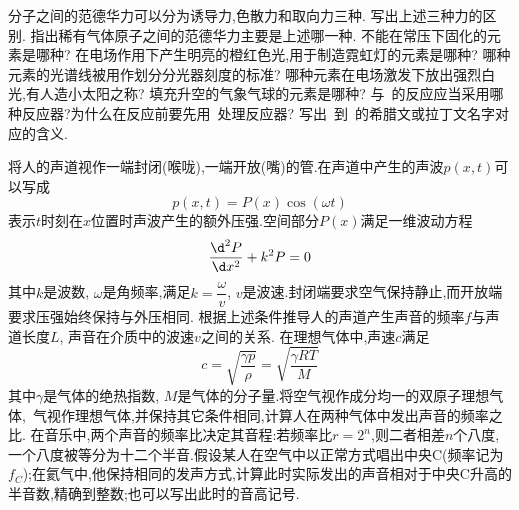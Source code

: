 \documentclass{ctexbook}
\begin{document}
\begin{problem}{}
    \subproblem 分子之间的范德华力可以分为诱导力,色散力和取向力三种.
    \subsubproblem 写出上述三种力的区别.
    \subsubproblem 指出稀有气体原子之间的范德华力主要是上述哪一种.
    \subproblem 不能在常压下固化的元素是哪种?
    \subproblem 在电场作用下产生明亮的橙红色光,用于制造霓虹灯的元素是哪种?
    \subproblem 哪种元素的光谱线被用作划分分光器刻度的标准?
    \subproblem 哪种元素在电场激发下放出强烈白光,有人造小太阳之称?
    \subproblem 填充升空的气象气球的元素是哪种?
    \subproblem {}与~的反应应当采用哪种反应器?为什么在反应前要先用~处理反应器?
    \subproblem 写出~到~的希腊文或拉丁文名字对应的含义.
\end{problem}
\begin{problem}{}
    将人的声道视作一端封闭(喉咙),一端开放(嘴)的管.在声道中产生的声波$p(x,t)$可以写成
    \[p(x,t)=P(x)\cos(\omega t)\]
    表示$t$时刻在$x$位置时声波产生的额外压强.空间部分$P(x)$满足一维波动方程
    \[\dfrac{\d^2 P}{\d x^2}+k^2P=0\]
    其中$k$是波数, $\omega$是角频率,满足$k=\dfrac{\omega}{v}$, $v$是波速.封闭端要求空气保持静止,而开放端要求压强始终保持与外压相同.
    \subproblem 根据上述条件推导人的声道产生声音的频率$f$与声道长度$L$, 声音在介质中的波速$v$之间的关系.
    \subproblem 在理想气体中,声速$c$满足
    \[c=\sqrt{\dfrac{\gamma p}{\rho}}=\sqrt{\dfrac{\gamma RT}{M}}\]
    其中$\gamma$是气体的绝热指数, $M$是气体的分子量.将空气视作成分均一的双原子理想气体,~气视作理想气体,并保持其它条件相同,计算人在两种气体中发出声音的频率之比.
    \subproblem 在音乐中,两个声音的频率比决定其音程:若频率比$r=2^n$,则二者相差$n$个八度,一个八度被等分为十二个半音.假设某人在空气中以正常方式唱出中央C(频率记为 $f_C$);在氦气中,他保持相同的发声方式,计算此时实际发出的声音相对于中央C升高的半音数,精确到整数;也可以写出此时的音高记号.
\end{problem}
\end{document}
